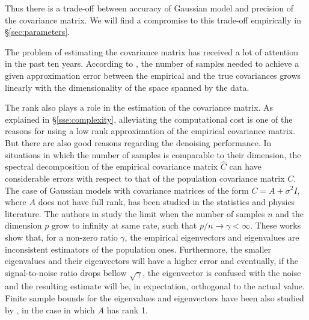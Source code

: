 \documentclass[10pt, journal, twocolumn, final, a4paper]{IEEEtran}
\newcommand{\pcomment}[1]{}
\begin{document}
Thus there is a trade-off between accuracy of Gaussian model and precision of the
covariance matrix. We will find a compromise to this trade-off empirically  in
\S \ref{sec:parameters}.


The problem of estimating the covariance matrix has received a lot of attention in the
past ten years.
According to \cite{Vershynin2012}, the number of samples needed to achieve a given approximation
error between the empirical and the true covariances grows linearly with the
dimensionality of the space spanned by the data. 

The rank also plays a role in the estimation of the covariance matrix.
As explained in \S \ref{sse:complexity}, alleviating the computational cost is
one of the reasons for using a low rank approximation of the empirical
covariance matrix. But there are also good reasons regarding the denoising
performance. In situations in which the number of samples 
is comparable to their dimension, the spectral decomposition of the empirical
covariance matrix $\widehat C$ can have considerable errors with respect to
that of the population covariance matrix $C$. 
%
The case of Gaussian models with covariance matrices of the form $C = A + \sigma^2I$,
where $A$ does not have full rank, has been studied in the statistics and physics
literature. The authors in \cite{johnstone2009,paul2007,nadler2008} study the
limit when the number of samples $n$ and the dimension $p$ grow to infinity at
same rate, such that $p/n\to\gamma < \infty$.  These works show that, for a
non-zero ratio $\gamma$, the empirical eigenvectors 
and eigenvalues are inconsistent estimators of the population ones.
Furthermore, the smaller eigenvalues and their eigenvectors will have a higher
error and eventually, if the signal-to-noise ratio drops bellow $\sqrt{\gamma}$, 
the eigenvector is confused with the noise and the resulting estimate will be,
in expectation, orthogonal to the actual value.
Finite sample bounds for the eigenvalues and eigenvectors have been also studied 
by \cite{nadler2008}, in the case in which $A$ has rank 1.
\pcomment{What can we say about this bounds.}
\end{document}
